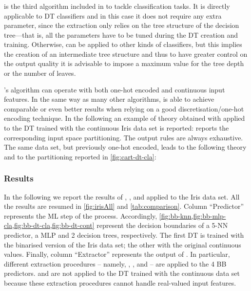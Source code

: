 \documentclass[12pt,a4paper,openright,twoside]{book}
\begin{document}
\subsubsection{\cart{}}\label{sssec:cartClass}

\cart{} is the third algorithm included in \psyke{} to tackle classification tasks.
%
It is directly applicable to DT classifiers and in this case it does not require any extra parameter, since the extraction only relies on the tree structure of the decision tree---that is, all the parameters have to be tuned during the DT creation and training.
%
Otherwise, \cart{} can be applied to other kinds of classifiers, but this implies the creation of an intermediate tree structure and thus to have greater control on the output quality it is advisable to impose a maximum value for the tree depth or the number of leaves.

\psyke{}'s \cart{} algorithm can operate with both one-hot encoded and continuous input features.
%
In the same way as many other algorithms, \cart{} is able to achieve comparable or even better results when relying on a good discretisation/one-hot encoding technique.
%
In the following an example of theory obtained with \cart{} applied to the DT trained with the continuous Iris data set is reported:
%
%
 reports the corresponding input space partitioning.
%
The output rules are always exhaustive.
%
The same data set, but previously one-hot encoded, leads to the following theory and to the partitioning reported in \cref{fig:cart-dt-cla}:
%

\subsubsection{Results}\label{sssec:resultsClass}





In the following we report the results of \real{}, \trepan{}, and \cart{} applied to the Iris data set.
%
All the results are resumed in \cref{fig:irisAll} and \cref{tab:comparison}.
%
Column ``Predictor'' represents the ML step of the process.
%
Accordingly, \cref{fig:bb-knn,fig:bb-mlp-cla,fig:bb-dt-cla,fig:bb-dt-cont} represent the decision boundaries of a 5-NN predictor, a MLP and 2 decision trees, respectively.
%
The first DT is trained with the binarised version of the Iris data set; the other with the original continuous values.
%
Finally, column ``Extractor'' represents the output of \psyke{}.
%
In particular, different extraction procedures -- namely, \real{}, \trepan{}, and \cart{} -- are applied to the 4 BB predictors.
%
\real{} and \trepan{} are not applied to the DT trained with the continuous data set because these extraction procedures cannot handle real-valued input features.
\end{document}
